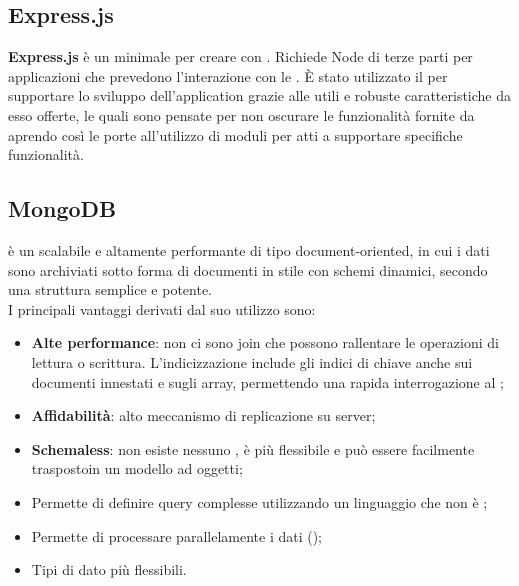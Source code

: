 	\subsection{Express.js}
\textbf{Express.js} è un  minimale per creare   con . Richiede  Node di terze parti per applicazioni che prevedono l'interazione con le .
È stato utilizzato il   per supportare lo sviluppo dell'application  grazie alle utili e robuste caratteristiche da esso offerte, le quali sono pensate per non oscurare le funzionalità fornite da  aprendo così le porte all'utilizzo di moduli per  atti a supportare specifiche funzionalità.

	\subsection{MongoDB}
\textbf{} è un    scalabile e altamente performante di tipo document-oriented, in cui i dati sono archiviati sotto forma di documenti in stile  con schemi dinamici, secondo una struttura semplice e potente. \\

I principali vantaggi derivati dal suo utilizzo sono:

 \begin{itemize}

\item \textbf{Alte performance}: non ci sono join che possono rallentare le operazioni di lettura o scrittura. L'indicizzazione include gli indici di chiave anche sui documenti innestati e sugli array, permettendo una rapida interrogazione al ;
\item \textbf{Affidabilità}: alto meccanismo di replicazione su server;
\item \textbf{Schemaless}: non esiste nessuno  , è più flessibile e può essere facilmente traspostoin un modello ad oggetti;
\item Permette di definire query complesse utilizzando un linguaggio che non è ;
\item Permette di processare parallelamente i dati ();
\item Tipi di dato più flessibili.
\end{itemize}  
